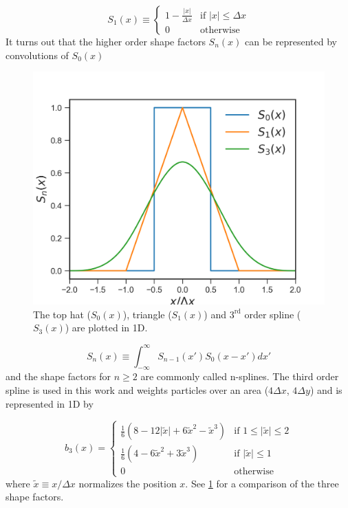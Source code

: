 \begin{equation}
	S_1(x) \equiv \begin{cases}
		1-\frac{\lvert x \rvert}{\Delta x} & \text{if } \lvert x \rvert \leq \Delta x \\
		0 & \text{otherwise}
	\end{cases} \label{eq:triangle}
\end{equation}
It turns out that the higher order shape factors $S_n(x)$ can be represented by convolutions of $S_0(x)$ 

\begin{figure}
	\centering 
	\includegraphics[width=0.6\linewidth]{planning/images/shape_functions.png}
	\caption{The top hat ($S_0(x)$), triangle ($S_1(x)$) and $3^\text{rd}$ order spline ($S_3(x)$) are plotted in 1D.}
	\label{fig:shape_factors}
\end{figure}

\begin{equation}
	S_n(x) \equiv \int_{-\infty}^\infty S_{n-1}(x')S_0(x-x') dx'
\end{equation}
and the shape factors for $n \geq 2$ are commonly called n-splines. The third order spline is used in this work and weights particles over an area ($4 \Delta x$, $4 \Delta y$) and is represented in 1D by 

\begin{equation}
	b_3(x) = \begin{cases}
		\frac{1}{6}(8 - 12 \lvert \tilde{x} \rvert + 6 \tilde{x}^2 - \tilde{x}^3) & \text{if } 1 \leq \lvert \tilde{x} \rvert \leq 2 \\
		\frac{1}{6}(4 - 6 \tilde{x}^2 + 3 \tilde{x}^3) & \text{if } \lvert \tilde{x} \rvert \leq 1 \\
		0 & \text{otherwise}
	\end{cases}
\end{equation}
where $\tilde{x} \equiv x / \Delta x$ normalizes the position $x$. See \cref{fig:shape_factors} for a comparison of the three shape factors. 

